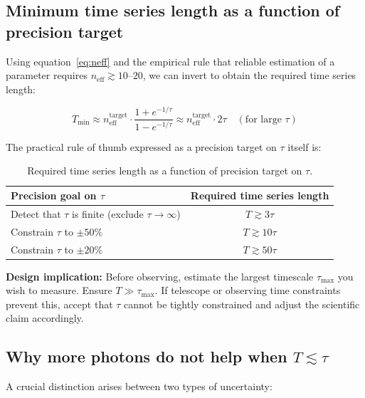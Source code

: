 \documentclass[11pt, a4paper]{article}
\begin{document}
\subsection{Minimum time series length as a function of precision target}

Using equation~\eqref{eq:neff} and the empirical rule that reliable estimation of
a parameter requires $n_\mathrm{eff} \gtrsim 10$--$20$, we can invert to obtain the
required time series length:

\begin{equation}
    T_\mathrm{min} \approx n_\mathrm{eff}^\mathrm{target} \cdot \frac{1 + e^{-1/\tau}}{1 - e^{-1/\tau}}
    \approx n_\mathrm{eff}^\mathrm{target} \cdot 2\tau \quad (\text{for large } \tau)
\end{equation}

The practical rule of thumb expressed as a precision target on $\tau$ itself is:

\begin{table}[h!]
\centering
\caption{Required time series length as a function of precision target on $\tau$.}
\label{tab:Tmin}
\begin{tabular}{lc}
\toprule
Precision goal on $\hat{\tau}$ & Required time series length \\
\midrule
Detect that $\tau$ is finite (exclude $\tau \to \infty$) & $T \gtrsim 3\tau$ \\
Constrain $\tau$ to $\pm 50\%$ & $T \gtrsim 10\tau$ \\
Constrain $\tau$ to $\pm 20\%$ & $T \gtrsim 50\tau$ \\
\bottomrule
\end{tabular}
\end{table}

\begin{keybox}
\textbf{Design implication:} Before observing, estimate the largest timescale $\tau_\mathrm{max}$
you wish to measure. Ensure $T \gg \tau_\mathrm{max}$. If telescope or observing time
constraints prevent this, accept that $\tau$ cannot be tightly constrained and adjust
the scientific claim accordingly.
\end{keybox}

\subsection{Why more photons do not help when $T \lesssim \tau$}

A crucial distinction arises between two types of uncertainty:
\end{document}
